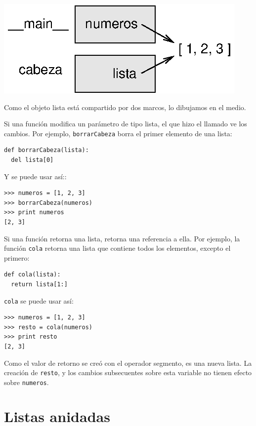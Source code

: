 \beforefig
\centerline{\includegraphics{illustrations/stack5.eps}}
\afterfig

Como el objeto lista está compartido por dos marcos, lo
dibujamos en el medio.

Si una función modifica un parámetro de tipo lista, el que hizo el llamado
ve los cambios. Por ejemplo, \texttt{borrarCabeza} borra el primer 
elemento de una lista:

\beforeverb
\begin{verbatim}
def borrarCabeza(lista):
  del lista[0]
\end{verbatim}
\afterverb
%
Y se puede usar así::

\beforeverb
\begin{verbatim}
>>> numeros = [1, 2, 3]
>>> borrarCabeza(numeros)
>>> print numeros
[2, 3]
\end{verbatim}
\afterverb
%
Si una función retorna una lista, retorna una referencia a ella.
Por ejemplo, la función \texttt{cola} retorna una lista que contiene 
todos los elementos, excepto el primero:

\beforeverb
\begin{verbatim}
def cola(lista):
  return lista[1:]
\end{verbatim}
\afterverb
%
\texttt{cola} se puede usar así:

\beforeverb
\begin{verbatim}
>>> numeros = [1, 2, 3]
>>> resto = cola(numeros)
>>> print resto
[2, 3]
\end{verbatim}
\afterverb
%
Como el valor de retorno se creó con el operador segmento, es una
nueva lista. La creación de  \texttt{resto}, y los cambios subsecuentes
sobre esta variable no tienen efecto sobre \texttt{numeros}.



\section{Listas anidadas}
\label{nested lists}

